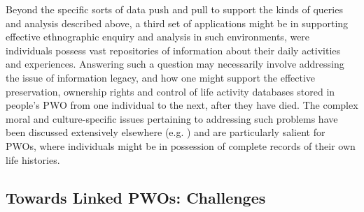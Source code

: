 \documentclass[letterpaper]{sig-alternate}
\begin{document}
Beyond the specific sorts of data push and pull to support the kinds of queries and analysis described above, a third set of applications might be in supporting effective ethnographic enquiry and analysis in such environments, were individuals possess vast repositories of information about their daily activities and experiences.  Answering such a question may necessarily involve addressing the issue of information legacy, and how one might support the effective preservation, ownership rights and control of life activity databases stored in people's PWO from one individual to the next, after they have died.  The complex moral and culture-specific issues pertaining to addressing such problems have been discussed extensively elsewhere (e.g. \cite{shields1996cultures,fernandez2001moral}) and are particularly salient for PWOs, where individuals might be in possession of complete records of their own life histories.

\subsection{Towards Linked PWOs: Challenges}


\end{document}
